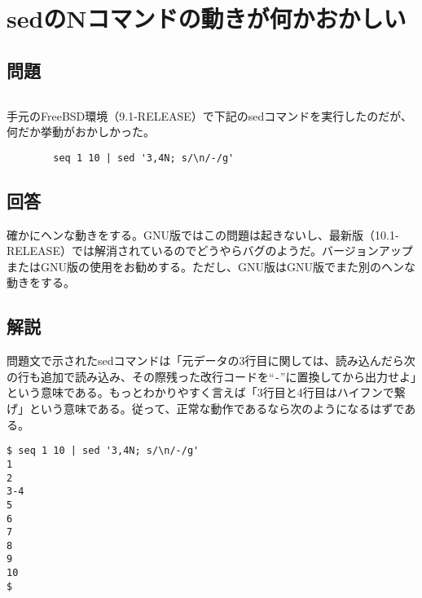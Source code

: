 \section{sedのNコマンドの動きが何かおかしい}
\label{recipe:sed}

\subsection*{問題}
\noindent
$\!\!\!\!\!$
\begin{grshfboxit}{160.0mm}
	手元のFreeBSD環境（9.1-RELEASE）で下記のsedコマンドを実行したのだが、何だか挙動がおかしかった。
	\begin{verbatim}
		seq 1 10 | sed '3,4N; s/\n/-/g'
	\end{verbatim}
\end{grshfboxit}

\subsection*{回答}
確かにヘンな動きをする。GNU版ではこの問題は起きないし、最新版（10.1-RELEASE）では解消されているのでどうやらバグのようだ。バージョンアップまたはGNU版の使用をお勧めする。ただし、GNU版はGNU版でまた別のヘンな動きをする。

\subsection*{解説}

問題文で示されたsedコマンドは「元データの3行目に関しては、読み込んだら次の行も追加で読み込み、その際残った改行コードを``\verb|-|''に置換してから出力せよ」という意味である。もっとわかりやすく言えば「3行目と4行目はハイフンで繋げ」という意味である。従って、正常な動作であるなら次のようになるはずである。

\begin{screen}
	\verb!$ seq 1 10 | sed '3,4N; s/\n/-/g'! \return \\
	\verb!1! \\
	\verb!2! \\
	\verb!3-4! \\
	\verb!5! \\
	\verb!6! \\
	\verb!7! \\
	\verb!8! \\
	\verb!9! \\
	\verb!10! \\
	\verb!$ !
\end{screen}

